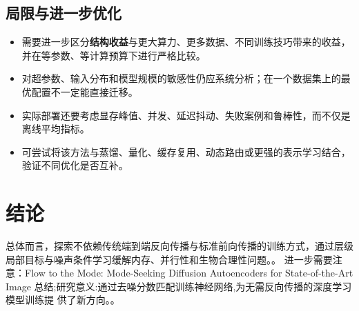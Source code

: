\documentclass[UTF8,11pt,a4paper]{ctexart}
\newcommand{\term}[1]{\textbf{\textcolor{mainblue}{#1}}}
\begin{document}
\subsection{局限与进一步优化}
\begin{itemize}
\item 需要进一步区分\term{结构收益}与更大算力、更多数据、不同训练技巧带来的收益，并在等参数、等计算预算下进行严格比较。
\item 对超参数、输入分布和模型规模的敏感性仍应系统分析；在一个数据集上的最优配置不一定能直接迁移。
\item 实际部署还要考虑显存峰值、并发、延迟抖动、失败案例和鲁棒性，而不仅是离线平均指标。
\item 可尝试将该方法与蒸馏、量化、缓存复用、动态路由或更强的表示学习结合，验证不同优化是否互补。
\end{itemize}

\section{结论}
总体而言，探索不依赖传统端到端反向传播与标准前向传播的训练方式，通过层级局部目标与噪声条件学习缓解内存、并行性和生物合理性问题。。 进一步需要注意：Flow to the Mode: Mode-Seeking Diffusion Autoencoders for State-of-the-Art Image 总结;研究意义:通过去噪分数匹配训练神经网络,为无需反向传播的深度学习模型训练提 供了新方向。。
\end{document}
